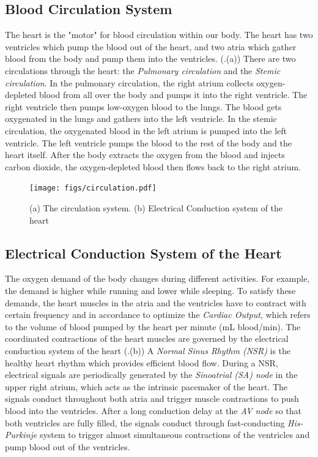 \subsection{Blood Circulation System}
The heart is the "motor" for blood circulation within our body. The heart has two ventricles which pump the blood out of the heart, and two atria which gather blood from the body and pump them into the ventricles. (.(a)) There are two circulations through the heart: the \emph{Pulmonary circulation} and the \emph{Stemic circulation}. In the pulmonary circulation, the right atrium collects oxygen-depleted blood from all over the body and pumps it into the right ventricle. The right ventricle then pumps low-oxygen blood to the lungs. The blood gets oxygenated in the lungs and gathers into the left ventricle. In the stemic circulation, the oxygenated blood in the left atrium is pumped into the left ventricle. The left ventricle pumps the blood to the rest of the body and the heart itself. After the body extracts the oxygen from the blood and injects carbon dioxide, the oxygen-depleted blood then flows back to the right atrium.
\begin{figure}[!t]
\centering
		\texttt{[image: figs/circulation.pdf]}
		
\caption{\small (a) The circulation system. (b) Electrical Conduction system of the heart}
\label{fig:circulation}
\end{figure} 
\subsection{Electrical Conduction System of the Heart}
The oxygen demand of the body changes during different activities. For example, the demand is higher while running and lower while sleeping. To satisfy these demands, the heart muscles in the atria and the ventricles have to contract with certain frequency and in accordance to optimize the \emph{Cardiac Output}, which refers to the volume of blood pumped by the heart per minute (mL blood/min). The coordinated contractions of the heart muscles are governed by the electrical conduction system of the heart (.(b)) A \emph{Normal Sinus Rhythm (NSR)} is the healthy heart rhythm which provides efficient blood flow. During a NSR, electrical signals are periodically generated by the \emph{Sinoatrial (SA) node} in the upper right atrium, which acts as the intrinsic pacemaker of the heart. The signals conduct throughout both atria and trigger muscle contractions to push blood into the ventricles. After a long conduction delay at the \emph{AV node} so that both ventricles are fully filled, the signals conduct through fast-conducting \emph{His-Purkinje} system to trigger almost simultaneous contractions of the ventricles and pump blood out of the ventricles. 

